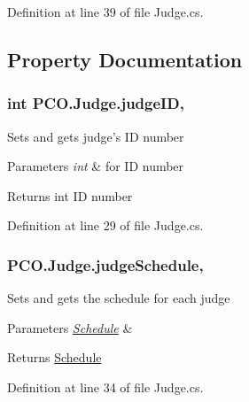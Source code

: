 Definition at line 39 of file Judge.\+cs.



\subsection{Property Documentation}
\hypertarget{classPCO_1_1Judge_ae025be7243620fb90013477bc81bb6ad}{
\subsubsection[{judge\+I\+D}]{\setlength{\rightskip}{0pt plus 5cm}int P\+C\+O.\+Judge.\+judge\+I\+D\hspace{0.3cm}{\ttfamily [get]}, {\ttfamily [set]}}}\label{classPCO_1_1Judge_ae025be7243620fb90013477bc81bb6ad}
Sets and gets judge's I\+D number 
\begin{DoxyParams}{Parameters}
{\em int} & for I\+D number \\
\hline
\end{DoxyParams}
\begin{DoxyReturn}{Returns}
int I\+D number 
\end{DoxyReturn}


Definition at line 29 of file Judge.\+cs.

\hypertarget{classPCO_1_1Judge_abc1631a408c0d72e62daa23783cc6330}{
\subsubsection[{judge\+Schedule}]{ P\+C\+O.\+Judge.\+judge\+Schedule\hspace{0.3cm}{\ttfamily [get]}, {\ttfamily [set]}}}\label{classPCO_1_1Judge_abc1631a408c0d72e62daa23783cc6330}
Sets and gets the schedule for each judge 
\begin{DoxyParams}{Parameters}
{\em \hyperlink{classPCO_1_1Schedule}{Schedule}} & \\
\hline
\end{DoxyParams}
\begin{DoxyReturn}{Returns}
\hyperlink{classPCO_1_1Schedule}{Schedule} 
\end{DoxyReturn}


Definition at line 34 of file Judge.\+cs.

